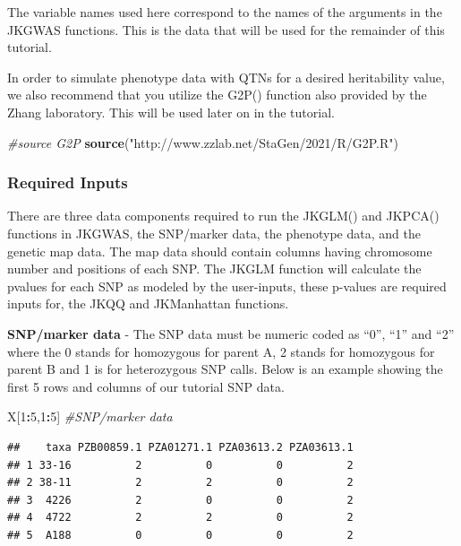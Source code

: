 \documentclass[
]{article}
\newenvironment{Shaded}{\begin{snugshade}}{\end{snugshade}}
\newcommand{\CommentTok}[1]{\textcolor[rgb]{0.56,0.35,0.01}{\textit{#1}}}
\newcommand{\DecValTok}[1]{\textcolor[rgb]{0.00,0.00,0.81}{#1}}
\newcommand{\KeywordTok}[1]{\textcolor[rgb]{0.13,0.29,0.53}{\textbf{#1}}}
\newcommand{\NormalTok}[1]{#1}
\newcommand{\OperatorTok}[1]{\textcolor[rgb]{0.81,0.36,0.00}{\textbf{#1}}}
\newcommand{\StringTok}[1]{\textcolor[rgb]{0.31,0.60,0.02}{#1}}
\begin{document}
The variable names used here correspond to the names of the arguments in
the JKGWAS functions. This is the data that will be used for the
remainder of this tutorial.

In order to simulate phenotype data with QTNs for a desired heritability
value, we also recommend that you utilize the G2P() function also
provided by the Zhang laboratory. This will be used later on in the
tutorial.

\begin{Shaded}
\begin{Highlighting}[]
\CommentTok{\#source G2P}
\KeywordTok{source}\NormalTok{(}\StringTok{"http://www.zzlab.net/StaGen/2021/R/G2P.R"}\NormalTok{)}
\end{Highlighting}
\end{Shaded}

\hypertarget{required-inputs}{%
\subsubsection{\texorpdfstring{\textbf{Required
Inputs}}{Required Inputs}}\label{required-inputs}}

There are three data components required to run the JKGLM() and JKPCA()
functions in JKGWAS, the SNP/marker data, the phenotype data, and the
genetic map data. The map data should contain columns having chromosome
number and positions of each SNP. The JKGLM function will calculate the
pvalues for each SNP as modeled by the user-inputs, these p-values are
required inputs for, the JKQQ and JKManhattan functions.

\par

\textbullet \textbf{SNP/marker data} - The SNP data must be numeric
coded as ``0'', ``1'' and ``2'' where the 0 stands for homozygous for
parent A, 2 stands for homozygous for parent B and 1 is for heterozygous
SNP calls. Below is an example showing the first 5 rows and columns of
our tutorial SNP data.

\begin{Shaded}
\begin{Highlighting}[]
\NormalTok{X[}\DecValTok{1}\OperatorTok{:}\DecValTok{5}\NormalTok{,}\DecValTok{1}\OperatorTok{:}\DecValTok{5}\NormalTok{] }\CommentTok{\#SNP/marker data}
\end{Highlighting}
\end{Shaded}

\begin{verbatim}
##    taxa PZB00859.1 PZA01271.1 PZA03613.2 PZA03613.1
## 1 33-16          2          0          0          2
## 2 38-11          2          2          0          2
## 3  4226          2          0          0          2
## 4  4722          2          2          0          2
## 5  A188          0          0          0          2
\end{verbatim}
\end{document}
